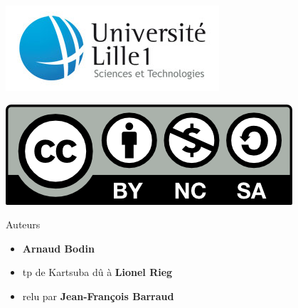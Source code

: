 








\begin{frame}

\thispagestyle{empty}    

  \hspace*{-20ex}
  \begin{minipage}{0.6\textwidth}
  \begin{center}
    \vspace*{5ex}   


    \bigskip

    \includegraphics[scale=0.3]{../divers/logotypeLille1-QUADRI-ECRAN.jpg}

    \vspace*{5ex}

    \includegraphics[scale=0.5]{../divers/by-nc-sa.png}
  \end{center}
  \end{minipage}
  \hfil
  \begin{minipage}{0.65\textwidth}
  \vspace*{5ex}
  Auteurs
  \begin{itemize}
    \item {\bf Arnaud Bodin}
    \item tp de Kartsuba dû à {\bf \small Lionel Rieg}
    \item relu par {\bf \small Jean-François Barraud}
  \end{itemize}


\end{minipage}
\end{frame}
